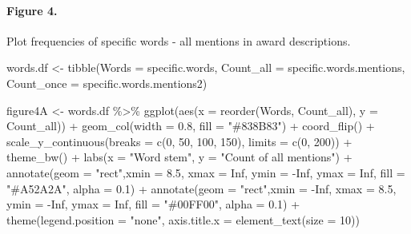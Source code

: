 \documentclass[
]{article}
\newenvironment{Shaded}{\begin{snugshade}}{\end{snugshade}}
\newcommand{\AttributeTok}[1]{\textcolor[rgb]{0.77,0.63,0.00}{#1}}
\newcommand{\ConstantTok}[1]{\textcolor[rgb]{0.00,0.00,0.00}{#1}}
\newcommand{\DecValTok}[1]{\textcolor[rgb]{0.00,0.00,0.81}{#1}}
\newcommand{\FloatTok}[1]{\textcolor[rgb]{0.00,0.00,0.81}{#1}}
\newcommand{\FunctionTok}[1]{\textcolor[rgb]{0.00,0.00,0.00}{#1}}
\newcommand{\NormalTok}[1]{#1}
\newcommand{\OtherTok}[1]{\textcolor[rgb]{0.56,0.35,0.01}{#1}}
\newcommand{\SpecialCharTok}[1]{\textcolor[rgb]{0.00,0.00,0.00}{#1}}
\newcommand{\StringTok}[1]{\textcolor[rgb]{0.31,0.60,0.02}{#1}}
\begin{document}
\hypertarget{figure-4.}{%
\paragraph{Figure 4.}\label{figure-4.}}

Plot frequencies of specific words - all mentions in award descriptions.

\begin{Shaded}
\begin{Highlighting}[]
\NormalTok{words.df }\OtherTok{\textless{}{-}} \FunctionTok{tibble}\NormalTok{(}\AttributeTok{Words =}\NormalTok{ specific.words, }
                            \AttributeTok{Count\_all =}\NormalTok{ specific.words.mentions,}
                            \AttributeTok{Count\_once =}\NormalTok{ specific.words.mentions2)}

\NormalTok{figure4A }\OtherTok{\textless{}{-}}\NormalTok{ words.df }\SpecialCharTok{\%\textgreater{}\%}
    \FunctionTok{ggplot}\NormalTok{(}\FunctionTok{aes}\NormalTok{(}\AttributeTok{x =} \FunctionTok{reorder}\NormalTok{(Words, Count\_all), }\AttributeTok{y =}\NormalTok{ Count\_all)) }\SpecialCharTok{+} 
    \FunctionTok{geom\_col}\NormalTok{(}\AttributeTok{width =} \FloatTok{0.8}\NormalTok{, }\AttributeTok{fill =} \StringTok{"\#838B83"}\NormalTok{) }\SpecialCharTok{+}
    \FunctionTok{coord\_flip}\NormalTok{() }\SpecialCharTok{+}
    \FunctionTok{scale\_y\_continuous}\NormalTok{(}\AttributeTok{breaks =} \FunctionTok{c}\NormalTok{(}\DecValTok{0}\NormalTok{, }\DecValTok{50}\NormalTok{, }\DecValTok{100}\NormalTok{, }\DecValTok{150}\NormalTok{), }\AttributeTok{limits =} \FunctionTok{c}\NormalTok{(}\DecValTok{0}\NormalTok{, }\DecValTok{200}\NormalTok{)) }\SpecialCharTok{+}
    \FunctionTok{theme\_bw}\NormalTok{() }\SpecialCharTok{+} 
    \FunctionTok{labs}\NormalTok{(}\AttributeTok{x =} \StringTok{"Word stem"}\NormalTok{, }\AttributeTok{y =} \StringTok{"Count of all mentions"}\NormalTok{) }\SpecialCharTok{+} 
    \FunctionTok{annotate}\NormalTok{(}\AttributeTok{geom =} \StringTok{"rect"}\NormalTok{,}\AttributeTok{xmin =} \FloatTok{8.5}\NormalTok{, }\AttributeTok{xmax =} \ConstantTok{Inf}\NormalTok{, }\AttributeTok{ymin =} \SpecialCharTok{{-}}\ConstantTok{Inf}\NormalTok{, }\AttributeTok{ymax =} \ConstantTok{Inf}\NormalTok{, }\AttributeTok{fill =} \StringTok{"\#A52A2A"}\NormalTok{, }\AttributeTok{alpha =} \FloatTok{0.1}\NormalTok{) }\SpecialCharTok{+}
    \FunctionTok{annotate}\NormalTok{(}\AttributeTok{geom =} \StringTok{"rect"}\NormalTok{,}\AttributeTok{xmin =} \SpecialCharTok{{-}}\ConstantTok{Inf}\NormalTok{, }\AttributeTok{xmax =} \FloatTok{8.5}\NormalTok{, }\AttributeTok{ymin =} \SpecialCharTok{{-}}\ConstantTok{Inf}\NormalTok{, }\AttributeTok{ymax =} \ConstantTok{Inf}\NormalTok{, }\AttributeTok{fill =} \StringTok{"\#00FF00"}\NormalTok{, }\AttributeTok{alpha =} \FloatTok{0.1}\NormalTok{) }\SpecialCharTok{+}
    \FunctionTok{theme}\NormalTok{(}\AttributeTok{legend.position =} \StringTok{"none"}\NormalTok{, }\AttributeTok{axis.title.x =} \FunctionTok{element\_text}\NormalTok{(}\AttributeTok{size =} \DecValTok{10}\NormalTok{))}
\end{Highlighting}
\end{Shaded}
\end{document}
